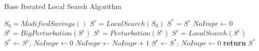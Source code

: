 \begin{algorithm}[htb]
    \caption{Base Iterated Local Search Algorithm}\label{alg:base_ILS}
    \begin{algorithmic}[1]
        \State $S_0 = ModifiedSavings()$ 
        \State $S^c = LocalSearch(S_0)$
        \State $S^* = S^c $
        \State $NoImpr \leftarrow 0$
        \State $S^c  = BigPerturbation(S^c )$ 
        \Else
        \State $S^c  = Perturbation(S^c )$ 
        \EndIf
        \State $S^c  = LocalSearch(S^c )$
        \State{}
        \State $S^* \gets S^c $; $NoImpr \gets 0$
        \Else
        \State $NoImpr \gets NoImpr + 1$
        \EndIf
        \State{}
        \State $S^c \gets S^* $; $NoImpr \gets 0$
        \EndIf
        \EndWhile
        \State \textbf{return} $S^*$
        \EndProcedure
    \end{algorithmic}
\end{algorithm}